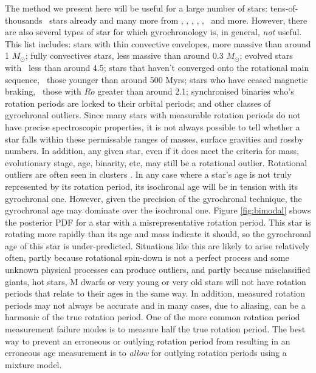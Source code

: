 The method we present here will be useful for a large number of stars:
tens-of-thousands \kepler\ stars already and many more from
\tess, \lsst, \wfirst, \plato, \gaia, \panstarrs\ and more.
However, there are also several types of star for which gyrochronology is, in
general, {\it not} useful.
This list includes: stars with thin convective envelopes, more massive than
around 1 $M_\odot$; fully convectives stars, less massive than around 0.3
$M_\odot$; evolved stars with \logg\ less than around 4.5; stars that haven't
converged onto the rotational main sequence, \ie\ those younger than around
500 Myrs; stars who have ceased magnetic braking, \ie\ those with $Ro$ greater
than around 2.1; synchronised binaries who's rotation periods are locked to
their orbital periods; and other classes of gyrochronal outliers.
Since many stars with measurable rotation periods do not have precise
spectroscopic properties, it is not always possible to tell whether a star
falls within these permissable ranges of masses, surface gravities and rossby
numbers.
In addition, any given star, even if it does meet the criteria for mass,
evolutionary stage, age, binarity, etc, may still be a rotational outlier.
Rotational outliers are often seen in clusters \citep[see \eg][]{douglas2016,
rebull2016, douglas2017, rebull2017}.
In any case where a star's age is not truly represented by its rotation
period, its isochronal age will be in tension with its gyrochronal one.
However, given the precision of the gyrochronal technique, the gyrochronal
age may dominate over the isochronal one.
Figure \ref{fig:bimodal} shows the posterior PDF for a star with a
misrepresentative rotation period.
This star is rotating more rapidly than its age and mass indicate it should,
so the gyrochronal age of this star is under-predicted.
Situations like this are likely to arise relatively often, partly because
rotational spin-down is not a perfect process and some unknown physical
processes can produce outliers, and partly because misclassified giants, hot
stars, M dwarfs or very young or very old stars will not have rotation periods
that relate to their ages in the same way.
In addition, measured rotation periods may not always be accurate and in many
cases, due to aliasing, can be a harmonic of the true rotation period.
One of the more common rotation period measurement failure modes is to measure
half the true rotation period.
The best way to prevent an erroneous or outlying rotation period from
resulting in an erroneous age measurement is to {\it allow} for outlying
rotation periods using a mixture model.

